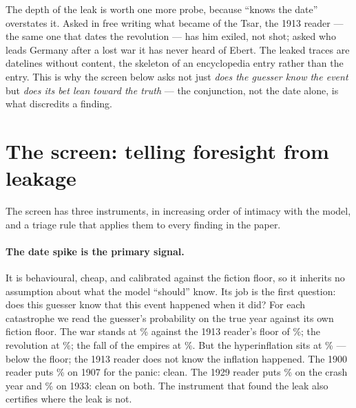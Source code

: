 \documentclass[11pt]{article}
\begin{document}
The depth of the leak is worth one more probe, because ``knows the date'' overstates it. Asked in free
writing what became of the Tsar, the 1913 reader --- the same one that dates the revolution --- has him
exiled, not shot; asked who leads Germany after a lost war it has never heard of Ebert. The leaked traces
are datelines without content, the skeleton of an encyclopedia entry rather than the entry. This is why
the screen below asks not just \emph{does the guesser know the event} but \emph{does its bet lean toward
the truth} --- the conjunction, not the date alone, is what discredits a finding.

\section{The screen: telling foresight from leakage}\label{sec:screen}

The screen has three instruments, in increasing order of intimacy with the model, and a triage rule that
applies them to every finding in the paper.

\paragraph{The date spike is the primary signal.} It is behavioural, cheap, and calibrated against the
fiction floor, so it inherits no assumption about what the model ``should'' know. Its job is the first
question: does this guesser know that this event happened when it did? For each catastrophe we read the
guesser's probability on the true year against its own fiction floor. The war stands at \NdateWar\%
against the 1913 reader's floor of \NfloorThirteen\%; the revolution at \NdateRev\%; the fall of the
empires at \NdateEmp\%. But the hyperinflation sits at \NdateInfl\% --- below the floor; the 1913 reader
does not know the inflation happened. The 1900 reader puts \NdatePanic\% on 1907 for the panic: clean.
The 1929 reader puts \NdateDep\% on the crash year and \NdateNazi\% on 1933: clean on both. The
instrument that found the leak also certifies where the leak is not.
\end{document}
